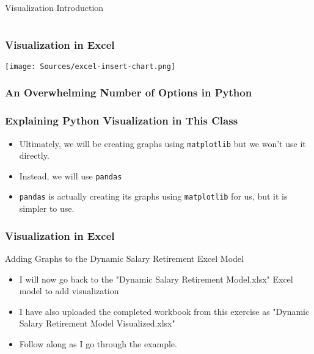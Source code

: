 \documentclass[handout, 11pt]{beamer}
\begin{document}
\begin{section}[Intro]{Visualization Introduction}
\begin{frame}
\begin{center}
\begin{tabular}{lcc}
\end{tabular}
\end{center}
\end{frame}
\begin{frame}
\frametitle{Visualization in Excel}
\begin{center}
\begin{adjustbox}{width=0.9\textwidth, height=0.8\textheight, keepaspectratio}
\texttt{[image: Sources/excel-insert-chart.png]}
\end{adjustbox}
\end{center}
\end{frame}
\begin{frame}
\frametitle{An Overwhelming Number of Options in Python}
\begin{center}
\begin{adjustbox}{width=0.9\textwidth, height=0.8\textheight, keepaspectratio}
\end{adjustbox}
\end{center}
\end{frame}
\begin{frame}
\frametitle{Explaining Python Visualization in This Class}
\begin{itemize}
\item Ultimately, we will be creating graphs using
\texttt{matplotlib}
but we won't use it directly.
\vfill
\item Instead, we will use
\texttt{pandas}
\vfill
\item \texttt{pandas}
is actually creating its graphs using
\texttt{matplotlib}
for us, but it is simpler to use.
\end{itemize}
\end{frame}
\begin{frame}
\frametitle{Visualization in Excel}
{
\begin{block}{Adding Graphs to the Dynamic Salary Retirement Excel Model}
\begin{itemize}
\item I will now go back to the "Dynamic Salary Retirement Model.xlsx" Excel model to add visualization
\item I have also uploaded the completed workbook from this exercise as "Dynamic Salary Retirement Model Visualized.xlsx"
\item Follow along as I go through the example.
\end{itemize}
\end{block}
}
\end{frame}
\end{section}
\end{document}
